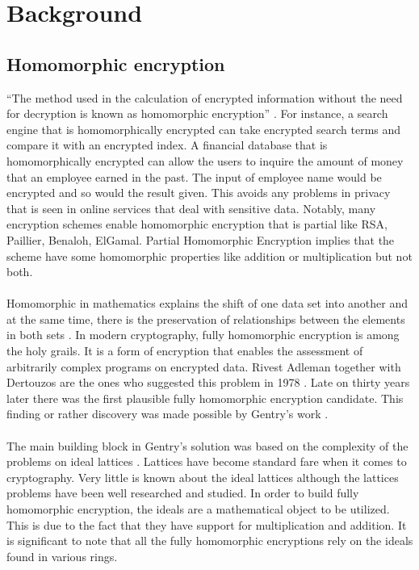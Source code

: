 \chapter{Background}

\section{Homomorphic encryption}
``The method used in the calculation of encrypted information without the need for decryption is known as homomorphic encryption'' \cite{wired2014}.
For instance, a search engine that is homomorphically encrypted can take encrypted search terms and compare it with an encrypted index. A financial database that is homomorphically encrypted can allow the users to inquire the amount of money that an employee earned in the past. The input of employee name would be encrypted and so would the result given. This avoids any problems in privacy that is seen in online services that deal with sensitive data. Notably, many encryption schemes enable homomorphic encryption that is partial like RSA, Paillier, Benaloh, ElGamal. Partial Homomorphic Encryption implies that the scheme have some homomorphic properties like addition or multiplication but not both. \\\\
Homomorphic in mathematics explains the shift of one data set into another and at the same time, there is the preservation of relationships between the elements in both sets \cite{tech2011}. In modern cryptography, fully homomorphic encryption is among the holy grails. It is a form of encryption that enables the assessment of arbitrarily complex programs on encrypted data\cite{brakerski2011fully}. Rivest Adleman together with Dertouzos are the ones who suggested this problem in 1978 \cite{rivest1978}. Late on thirty years later there was the first plausible fully homomorphic encryption candidate. This finding or rather discovery was made possible by Gentry's work \cite{gen09b} \cite{gen10}. \\\\
The main building block in Gentry's solution was based on the complexity of the problems on ideal lattices \cite{brakerski2011fully}. Lattices have become standard fare when it comes to cryptography. Very little is known about the ideal lattices although the lattices problems have been well researched and studied. In order to build fully homomorphic encryption, the ideals are a mathematical object to be utilized. This is due to the fact that they have support for multiplication and addition. It is significant to note that all the fully homomorphic encryptions rely on the ideals found in various rings.

